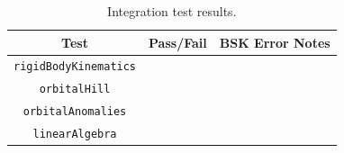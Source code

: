\begin{table}[h]
	\caption{Integration test results.}
	\label{tbl:avsLibraryResults}
	\centering \fontsize{10}{10}\selectfont
	\begin{tabular}{c | c | l } %
		\hline\hline
		\textbf{Test} 			& \textbf{Pass/Fail} 	 & \textbf{BSK Error Notes}
		\\ \hline
		{\tt rigidBodyKinematics}		  	&
		      	  &
		
		\\
		{\tt orbitalHill}		  	&
		      	  &
		
		\\
		{\tt orbitalAnomalies}		  	&
		      	  &
		
		\\
		{\tt linearAlgebra}		  	&
		      	  &
		
		\\
		\hline\hline
	\end{tabular}
\end{table}
